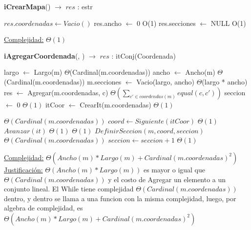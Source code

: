\begin{Algoritmos}

\medskip
	
  	\medskip
  
\begin{algorithm}[H]{\textbf{iCrearMapa}() $\to$ $res$ : estr}
    	\begin{algorithmic}[1]
			\State $res.coordenadas \gets Vacio()$ 
			\State res.ancho $\gets$ 0	\Comment O(1)
			\State res.secciones $\gets$ NULL \Comment O(1)
			
			\medskip
			\Statex \underline{Complejidad:} $\Theta(1)$
    	\end{algorithmic}
\end{algorithm}

\begin{algorithm}[H]{\textbf{iAgregarCoordenada}(, ) $\to$ $res$ : itConj(Coordenada)}
    	\begin{algorithmic}[1]
            \State  largo $\gets$ Largo(m)   \Comment $\Theta$(Cardinal(m.coordenadas))
            \State  ancho $\gets$ Ancho(m) \Comment $\Theta$(Cardinal(m.coordenadas))
            \State  m.secciones $\gets$ Vacio(largo, ancho) \Comment $\Theta$(largo * ancho)
			\State res $\gets$ Agregar(m.coordenadas, c) \Comment $\Theta\left(\displaystyle\sum_{c' \in coordendas(m)}equal(c,c')\right)$
            \State  seccion $\gets$ 0  \Comment $\Theta(1)$
            \State  itCoor $\gets$ CrearIt(m.coordenadas) \Comment $\Theta(1)$
			 
            			\Comment $\Theta(Cardinal(m.coordenadas))$
                \State $coord \gets Siguiente(itCoor)  $ \Comment $\Theta(1)$
			 	\State $Avanzar(it)$		\Comment $\Theta(1)$
                 \Comment $\Theta(1)$
                    \State $ DefinirSeccion(m, coord, seccion) $ \Comment $\Theta(Cardinal(m.coordenadas))$ 
                    \State $ seccion \gets seccion + 1 $ \Comment $\Theta(1)$
                \EndIf
			\EndWhile

			\medskip
			\Statex \underline{Complejidad:} $\Theta(Ancho(m) * Largo(m) + Cardinal(m.coordenadas)^2)$
			\Statex \underline{Justificación:} $\Theta(Ancho(m) * Largo(m))$ es mayor o igual que $\Theta(Cardinal(m.coordenadas))$ y el costo de Agregar un elemento a un conjunto lineal. El While tiene complejidad $\Theta(Cardinal(m.coordenadas))$ dentro, y dentro se llama a una funcion con la misma complejidad, luego, por algebra de complejidad, es $\Theta(Ancho(m) * Largo(m) + Cardinal(m.coordenadas)^2)$
    	\end{algorithmic}
\end{algorithm}


\end{Algoritmos}
